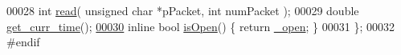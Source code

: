 \begin{DoxyCode}
00028     \textcolor{keywordtype}{int} \hyperlink{classdxl__hal_ac36331febb2eaa66303af3483795742a}{read}( \textcolor{keywordtype}{unsigned} \textcolor{keywordtype}{char} *pPacket, \textcolor{keywordtype}{int} numPacket );
00029     \textcolor{keywordtype}{double} \hyperlink{classdxl__hal_a6b6b7381c45308662fc3df6e7f74bc61}{get\_curr\_time}();
\hypertarget{dxl__hal_8h_source_l00030}{}\hyperlink{classdxl__hal_a88bba601b5c9f285fcdc14e18a1f3398}{00030}     \textcolor{keyword}{inline} \textcolor{keywordtype}{bool} \hyperlink{classdxl__hal_a88bba601b5c9f285fcdc14e18a1f3398}{isOpen}() \{ \textcolor{keywordflow}{return} \hyperlink{classdxl__hal_a04831154c43fe4f7499ea0950e0f0999}{\_open}; \}
00031 \};
00032 \textcolor{preprocessor}{#endif}
\end{DoxyCode}
